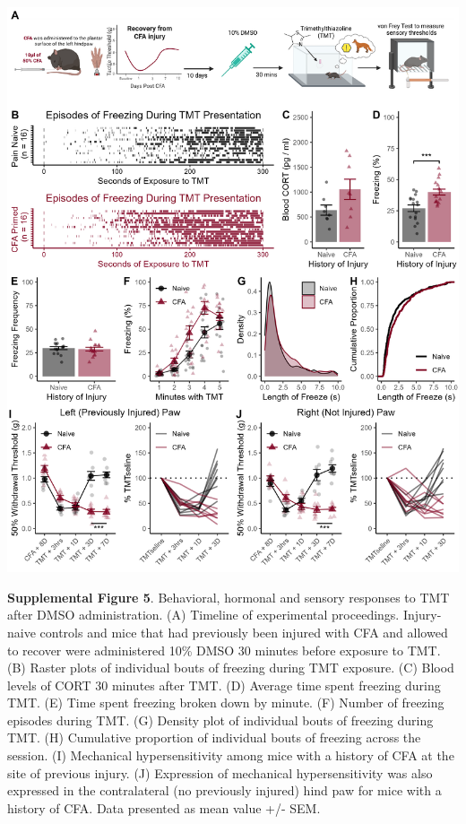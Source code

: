\documentclass[
]{book}
\begin{document}
\includegraphics[width=33.33in]{Figs/S5_DMSO_Panel}

\textbf{Supplemental Figure 5}. Behavioral, hormonal and sensory responses to TMT after DMSO administration. (A) Timeline of experimental proceedings. Injury-naive controls and mice that had previously been injured with CFA and allowed to recover were administered 10\% DMSO 30 minutes before exposure to TMT. (B) Raster plots of individual bouts of freezing during TMT exposure. (C) Blood levels of CORT 30 minutes after TMT. (D) Average time spent freezing during TMT. (E) Time spent freezing broken down by minute. (F) Number of freezing episodes during TMT. (G) Density plot of individual bouts of freezing during TMT. (H) Cumulative proportion of individual bouts of freezing across the session. (I) Mechanical hypersensitivity among mice with a history of CFA at the site of previous injury. (J) Expression of mechanical hypersensitivity was also expressed in the contralateral (no previously injured) hind paw for mice with a history of CFA. Data presented as mean value +/- SEM.
\end{document}
